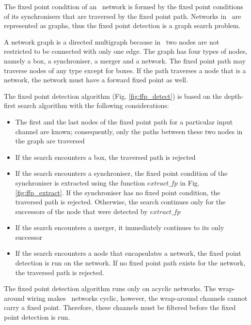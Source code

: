 The fixed point condition of an \ak\ network is formed by the fixed point conditions of its synchronisers that are traversed by the fixed point path. Networks in \ak\ are represented as graphs, thus the fixed point detection is a graph search problem.

A network graph is a directed multigraph because in \ak\ two nodes are not restricted to be connected with only one edge. The graph has four types of nodes, namely a box, a synchroniser, a merger and a network. The fixed point path may traverse nodes of any type except for boxes. If the path traverses a node that is a network, the network must have a forward fixed point as well.

The fixed point detection algorithm (Fig. \ref{fig:ffp_detect}) is based on the depth-first search algorithm with the following considerations:
\begin{itemize}
\item The first and the last nodes of the fixed point path for a particular input channel are known; consequently, only the paths between these two nodes in the graph are traversed

\item If the search encounters a box, the traversed path is rejected

\item If the search encounters a synchroniser, the fixed point condition of the synchroniser is extracted using the function $extract\_fp$ in Fig. \ref{fig:ffp_extract}. If the synchroniser has no fixed point condition, the traversed path is rejected. Otherwise, the search continues only for the successors of the node that were detected by $extract\_fp$

\item If the search encounters a merger, it immediately continues to its only successor

\item If the search encounters a node that encapsulates a network, the fixed point detection is run on the network. If no fixed point path exists for the network, the traversed path is rejected.
\end{itemize}

The fixed point detection algorithm runs only on acyclic networks. The wrap-around wiring makes \ak\ networks cyclic, however, the wrap-around channels cannot carry a fixed point. Therefore, these channels must be filtered before the fixed point detection is run.


